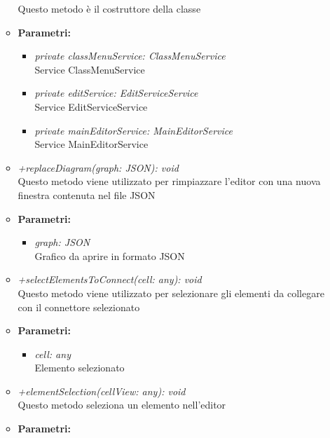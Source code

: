 \begin{itemize}
\begin{itemize}
          				Questo metodo è il costruttore della classe
          				\item \textbf{Parametri:}\\
            				\begin{itemize}
            					\item \emph{private classMenuService: ClassMenuService}\\
            					Service ClassMenuService
            					\item \emph{private editService: EditServiceService}\\
            					Service EditServiceService
            					\item \emph{private mainEditorService: MainEditorService}\\
            					Service MainEditorService
            				\end{itemize}
          				\item \emph{+replaceDiagram(graph: JSON): void}\\
          				Questo metodo viene utilizzato per rimpiazzare l'editor con una nuova finestra contenuta nel file JSON
          				\item \textbf{Parametri:}\\
            				\begin{itemize}
            					\item \emph{graph: JSON}\\
            					Grafico da aprire in formato JSON
            				\end{itemize}
          				\item \emph{+selectElementsToConnect(cell: any): void}\\  
          				Questo metodo viene utilizzato per selezionare gli elementi da collegare con il connettore selezionato
          				\item \textbf{Parametri:}\\
            				\begin{itemize}
            					\item \emph{cell: any}\\
            					Elemento selezionato
            				\end{itemize}
            			\item \emph{+elementSelection(cellView: any): void}\\
            			Questo metodo seleziona un elemento nell'editor
            			\item \textbf{Parametri:}\\

\end{itemize}
\end{itemize}
